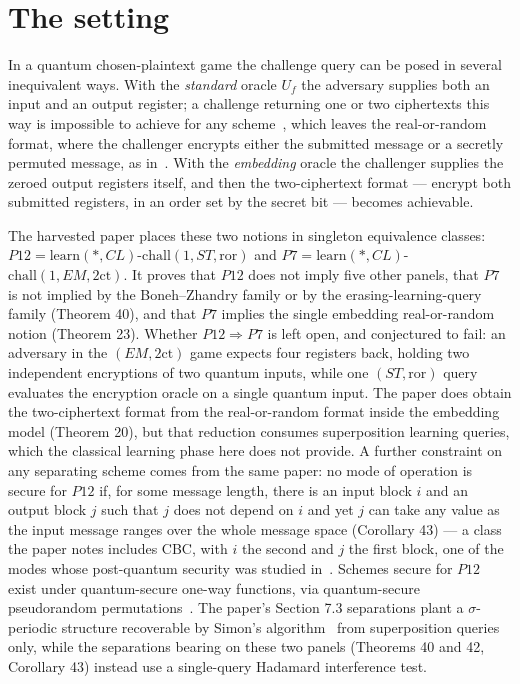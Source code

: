 \documentclass{conjura-conjecture}
\newcommand{\ror}{\mathrm{ror}}
\newcommand{\twoct}{2\mathrm{ct}}
\newcommand{\learn}{\mathrm{learn}}
\newcommand{\chall}{\mathrm{chall}}
\begin{document}
\section{The setting}\label{sec:setting}

In a quantum chosen-plaintext game the challenge query can be posed in
several inequivalent ways. With the \emph{standard} oracle $U_f$ the
adversary supplies both an input and an output register; a challenge
returning one or two ciphertexts this way is impossible to achieve for
any scheme~\cite{BZ13b}, which leaves the real-or-random format, where
the challenger encrypts either the submitted message or a secretly
permuted message, as in~\cite{MS16}. With the \emph{embedding} oracle
the challenger supplies the zeroed output registers itself, and then the
two-ciphertext format --- encrypt both submitted registers, in an order
set by the secret bit --- becomes achievable.

The harvested paper places these two notions in singleton equivalence
classes: $P12=\learn(*,CL)$-$\chall(1,ST,\ror)$ and
$P7=\learn(*,CL)$-$\chall(1,EM,\twoct)$. It proves that $P12$ does not
imply five other panels, that $P7$ is not implied by the Boneh--Zhandry
family or by the erasing-learning-query family (Theorem 40), and that
$P7$ implies the single embedding real-or-random notion (Theorem 23).
Whether $P12\Rightarrow P7$ is left open, and conjectured to fail: an
adversary in the $(EM,\twoct)$ game expects four registers back, holding
two independent encryptions of two quantum inputs, while one $(ST,\ror)$
query evaluates the encryption oracle on a single quantum input. The
paper does obtain the two-ciphertext format from the real-or-random
format inside the embedding model (Theorem 20), but that reduction
consumes superposition learning queries, which the classical learning
phase here does not provide. A further constraint on any separating
scheme comes from the same paper: no mode of operation is secure for
$P12$ if, for some message length, there is an input block $i$ and an
output block $j$ such that $j$ does not depend on $i$ and yet $j$ can
take any value as the input message ranges over the whole message space
(Corollary 43) --- a class the paper notes includes CBC, with $i$ the
second and $j$ the first block, one of the modes whose post-quantum
security was studied in~\cite{ATTU16}. Schemes secure for $P12$ exist
under quantum-secure one-way functions, via quantum-secure pseudorandom
permutations~\cite{Zha16}. The paper's Section 7.3 separations plant a
$\sigma$-periodic structure recoverable by Simon's
algorithm~\cite{Sim97} from superposition queries only, while the
separations bearing on these two panels (Theorems 40 and 42,
Corollary 43) instead use a single-query Hadamard interference test.
\end{document}

